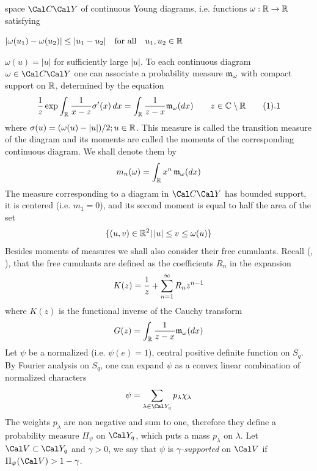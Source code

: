  space $\Cal C\Cal Y$ of continuous Young diagrams, i.e. 
  functions $\omega:\Bbb R\to
\Bbb R$ satisfying 
\roster\item $\vert\omega (u_1)-\omega(u_2)\vert\leq \vert
u_1-u_2\vert\quad \text{for all}\quad u_1,u_2\in\Bbb R$
\item $\omega(u)=\vert u\vert$ for sufficiently large $\vert
u\vert$.\endroster
To each continuous diagram $\omega\in\Cal C\Cal Y$ one can associate
a probability measure $\frak
m_{\omega}$ with compact support on $\Bbb R$,  determined by the equation
$${1\over z}\exp\int _{\Bbb R}{1\over
x-z}\sigma'(x)\,dx= \int_{\Bbb R}{1\over z-x}\frak
m_{\omega}(dx)\quad\quad z\in\Bbb C\setminus \Bbb R\tag 1.1$$
where
$\sigma(u)=(\omega(u)-\vert u\vert)/2; u\in \Bbb R$. 
This measure is 
called the transition measure of the diagram and its moments are
called the moments of the corresponding continuous diagram. 
We shall denote them
by $$m_n(\omega)=\int_{\Bbb R} x^n\,\frak m_{\omega}(dx)$$
The measure corresponding to a diagram in $\Cal C\Cal Y$ has bounded support, 
it   is centered (i.e.
$m_1=0$), and its 
second moment is equal to half the area of the set $$\{(u,v)\in\Bbb
R^2\vert\,
|u|\leq v\leq \omega(u)\}$$
Besides moments of measures we shall also consider their free cumulants. Recall
 (\cite{B}, \cite{VDN}),
 that the free cumulants are defined as the coefficients $R_n$ in the expansion
$$K(z)={1\over z}+\sum_{n=1}^{\infty}R_nz^{n-1}$$
where $K(z)$ is the 
functional 
inverse of the Cauchy transform $$G(z)=\int_{\Bbb R}{1\over z-x}\frak
m_{\omega}(dx)$$
\endsubhead
Let $\psi$ be a normalized (i.e. $\psi(e)=1$), central
 positive definite function on
$S_q$.
By Fourier analysis on $S_q$, one can
 expand $\psi$ as a convex linear combination of normalized
characters
$$\psi=\sum_{\lambda\in\Cal Y_q}p_{\lambda}\chi_{\lambda}$$
The weights $p_{\lambda}$ are non negative and sum to one, 
therefore they define a probability measure
$\Pi_{\psi}$ on $\Cal Y_q$, which puts a mass $p_{\lambda}$ on $\lambda$.
 Let $\Cal V\subset \Cal Y_q$ and $\gamma>0$,
 we say that $\psi$ is {\it $\gamma$-supported } on $\Cal V$ if $\Pi_{\psi}(\Cal
 V)>1-\gamma$.
 
